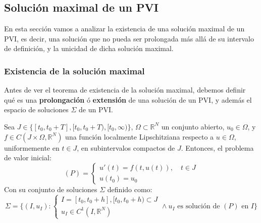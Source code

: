 \subsection{Solución maximal de un PVI}
En esta sección vamos a analizar la existencia de una solución maximal de un PVI, es decir, una solución que no pueda ser prolongada más allá de su intervalo de definición, y la unicidad de dicha solución maximal.\\

\subsubsection{Existencia de la solución maximal}

Antes de ver el teorema de existencia de la solución maximal, debemos definir qué es una \textbf{prolongación} ó \textbf{extensión} de una solución de un PVI, y además el espacio de soluciones $\Sigma$ de un PVI.

\begin{definición}
    Sea $J \in \{ [t_0, t_0 + T], [t_0, t_0 + T), [t_0, \infty) \}$, $\Omega \subset \mathbb{R}^N$ un conjunto abierto, $u_0 \in \Omega$, y $f \in C(J \times \Omega, \mathbb{R}^N)$ una función localmente Lipschitziana respecto a $u \in \Omega$, uniformemente en $t \in J$, en subintervalos compactos de $J$. Entonces, el problema de valor inicial:
    \[
        (P) =
        \begin{cases}
            u'(t) = f(t, u(t)), \quad t \in J \\
            u(t_0) = u_0
        \end{cases}
    \]
    Con su conjunto de soluciones $\Sigma$ definido como:
    \[
        \Sigma = \{
            (I, u_I) : 
            \begin{cases}
                I = [t_0, t_0 + h], [t_0, t_0 + h) \subset J \\
                u_I \in C^1(I, \mathbb{R}^N)
            \end{cases}
            \wedge u_I \text{ es solución de } (P) \text{ en } I
        \}
    \]
\end{definición}

